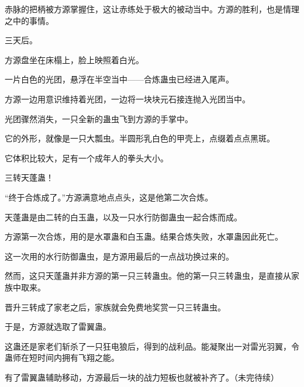 \begin{this_body}
赤脉的把柄被方源掌握住，这让赤练处于极大的被动当中。方源的胜利，也是情理之中的事情。

三天后。

方源盘坐在床榻上，脸上映照着白光。

一片白色的光团，悬浮在半空当中——合炼蛊虫已经进入尾声。

方源一边用意识维持着光团，一边将一块块元石接连抛入光团当中。

光团骤然消失，一只全新的蛊虫飞到方源的手掌中。

它的外形，就像是一只大瓢虫。半圆形乳白色的甲壳上，点缀着点点黑斑。

它体积比较大，足有一个成年人的拳头大小。

三转天蓬蛊！

“终于合炼成了。”方源满意地点点头，这是他第二次合炼。

天蓬蛊是由二转的白玉蛊，以及一只水行防御蛊虫一起合炼而成。

方源第一次合炼，用的是水罩蛊和白玉蛊。结果合炼失败，水罩蛊因此死亡。

这一次用的水行防御蛊虫，是方源用最后的一点战功换过来的。

然而，这只天蓬蛊并非方源的第一只三转蛊虫。他的第一只三转蛊虫，是直接从家族中取来。

晋升三转成了家老之后，家族就会免费地奖赏一只三转蛊虫。

于是，方源就选取了雷翼蛊。

这蛊还是家老们斩杀了一只狂电狼后，得到的战利品。能凝聚出一对雷光羽翼，令蛊师在短时间内拥有飞翔之能。

有了雷翼蛊辅助移动，方源最后一块的战力短板也就被补齐了。（未完待续）

\end{this_body}

